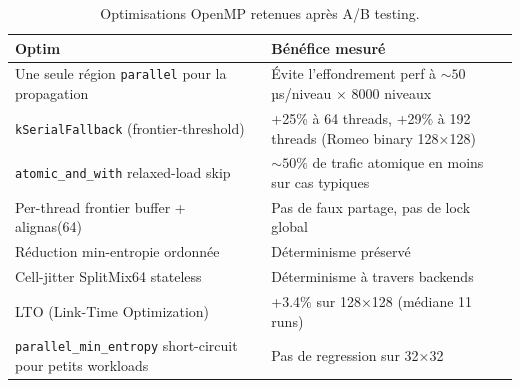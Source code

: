 \begin{table}[H]
\centering
\begin{tabularx}{\textwidth}{lX}
\toprule
\textbf{Optim} & \textbf{Bénéfice mesuré} \\
\midrule
Une seule région \texttt{parallel} pour la propagation & Évite l'effondrement perf à $\sim 50$ µs/niveau × 8000 niveaux \\
\texttt{kSerialFallback} (frontier-threshold) & +25\% à 64 threads, +29\% à 192 threads (Romeo binary 128×128) \\
\texttt{atomic\_and\_with} relaxed-load skip & $\sim 50\%$ de trafic atomique en moins sur cas typiques \\
Per-thread frontier buffer + alignas(64) & Pas de faux partage, pas de lock global \\
Réduction min-entropie ordonnée & Déterminisme préservé \\
Cell-jitter SplitMix64 stateless & Déterminisme à travers backends \\
LTO (Link-Time Optimization) & +3.4\% sur 128×128 (médiane 11 runs) \\
\texttt{parallel\_min\_entropy} short-circuit pour petits workloads & Pas de regression sur 32×32 \\
\bottomrule
\end{tabularx}
\caption{Optimisations OpenMP retenues après A/B testing.}
\label{tab:omp:kept}
\end{table}
